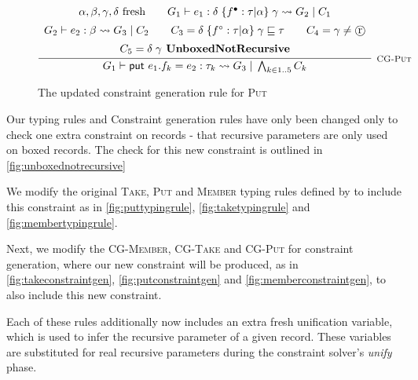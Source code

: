 \begin{figure}
    \centering
    \[
        \infer[\textsc{\footnotesize{CG-Put}}]{
            G_1 \vdash \textsf{put } e_1.f_k = e_2 : \tau_k \rightsquigarrow G_3\; 
                |\; \bigwedge_{k \in 1..5} C_k
        }{
            \begin{array}{c}
                \alpha, \beta, \gamma, \delta \text{ fresh}
                \hspace{2em}
                G_1 \vdash e_1 : \delta\; \{ f^\bullet: \tau | \alpha \}\; 
                    \gamma \rightsquigarrow G_2\; |\; C_1 \\[5pt]
                G_2 \vdash e_2 : \beta \rightsquigarrow G_3\; |\; C_2
                \hspace{2em}
                C_3 =  \delta\; \{ f^\circ : \tau | \alpha \}\; 
                    \gamma \subtype \tau
                \hspace{2em}
                C_4 = \gamma \neq \text{\textcircled{r}} \\[5pt]
                C_5 = \delta\; \gamma \textbf{ UnboxedNotRecursive}
            \end{array}
        }
    \]
    
    \caption{The updated constraint generation rule for \textsc{Put}}
    \label{fig:putconstraintgen}
\end{figure}

Our typing rules and Constraint generation rules have only been changed only to check one extra
constraint on records - that recursive parameters are only used on boxed records. The check for this
new constraint is outlined in \autoref{fig:unboxednotrecursive}

We modify the original \textsc{Take}, \textsc{Put} and \textsc{Member} typing rules defined by
\citet{LiamThesis} to include this constraint as in \autoref{fig:puttypingrule},
\autoref{fig:taketypingrule} and \autoref{fig:membertypingrule}.

Next, we modify the \textsc{CG-Member}, \textsc{CG-Take} and \textsc{CG-Put} for constraint generation,
where our new constraint will be produced, as in \autoref{fig:takeconstraintgen}, 
\autoref{fig:putconstraintgen} and \autoref{fig:memberconstraintgen}, to also include this
new constraint.

Each of these rules additionally now includes an extra fresh unification variable, which is
used to infer the recursive parameter of a given record. These variables are substituted
for real recursive parameters during the constraint solver's \textit{unify} phase.

